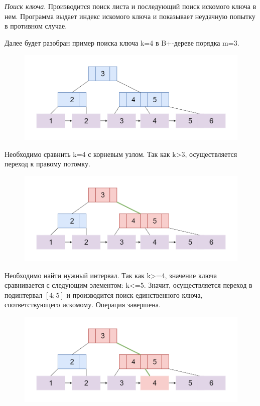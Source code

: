 \documentclass{article}
\begin{document}
\textit{Поиск ключа}. Производится поиск листа и последующий поиск искомого ключа в нем. Программа выдает индекс искомого ключа и показывает неудачную попытку в противном случае.

Далее будет разобран пример поиска ключа k=4 в B+-дереве порядка m=3.
\begin{figure}
\includegraphics[scale=0.4]{bsearch.png}
\caption{}
\end{figure}



Необходимо сравнить k=4 с корневым узлом. Так как k>3, осуществляется переход к правому потомку.
\begin{figure}
\includegraphics[scale=0.4]{bsearch2.png}

\caption{}
\end{figure}


Необходимо найти нужный интервал. Так как k>=4, значение ключа сравнивается с следующим элементом: k<=5. Значит, осуществляется переход в подинтервал $[4; 5]$ и производится поиск единственного ключа, соответствующего искомому. Операция завершена.
\begin{figure}
\includegraphics[scale=0.4]{bsearch3.png}

\caption{}
\end{figure}
\end{document}
